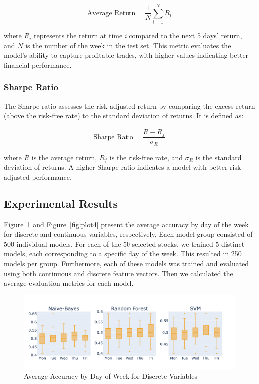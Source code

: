 \documentclass[aodsor,preprint]{imsart}
\numberwithin{equation}{section}
\theoremstyle{plain}
\begin{document}
\[
\text{Average Return} = \frac{1}{N} \sum_{i=1}^{N} R_i
\]

where $R_i$ represents the return at time $i$ compared to the next 5 days' return, and $N$ is the number of the week in the test set. This metric evaluates the model’s ability to capture profitable trades, with higher values indicating better financial performance.

\subsubsection{Sharpe Ratio}

The Sharpe ratio assesses the risk-adjusted return by comparing the excess return (above the risk-free rate) to the standard deviation of returns. It is defined as:

\[
\text{Sharpe Ratio} = \frac{\bar{R} - R_f}{\sigma_R}
\]

where $\bar{R}$ is the average return, $R_f$ is the risk-free rate, and $\sigma_R$ is the standard deviation of returns. A higher Sharpe ratio indicates a model with better risk-adjusted performance.

\subsection{Experimental Results}

\hyperref[fig:plot3]{Figure~\ref*{fig:plot3}} and \hyperref[fig:plot4]{Figure~\ref*{fig:plot4}} present the average accuracy by day of the week for discrete and continuous variables, respectively. 
Each model group consisted of 500 individual models. For each of the 50 selected stocks, we trained 5 distinct models, each corresponding to a specific day of the week. This resulted in 250 models per group. Furthermore, each of these models was trained and evaluated using both continuous and discrete feature vectors. Then we calculated the average evaluation metrics for each model. 

\begin{figure}[H]
  \centering
  \includegraphics[width=\textwidth]{plots/accuracy_continouos.png}
  \caption{Average Accuracy by Day of Week for Discrete Variables}
  \label{fig:plot3}
\end{figure}
\end{document}
